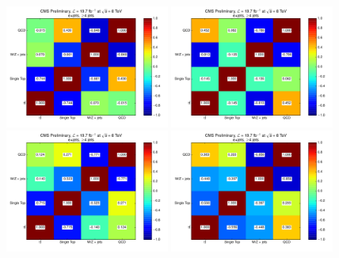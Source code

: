 \begin{figure}[hbtp]
    \centering
     \includegraphics[width=0.48\textwidth]{Chapters/07_08_09_Analysis/Images/fitchecks/8TeV/Correlations_electron_MET_0-27}\hfill    
     \includegraphics[width=0.48\textwidth]{Chapters/07_08_09_Analysis/Images/fitchecks/8TeV/Correlations_electron_MET_27-52}\\
	 \includegraphics[width=0.48\textwidth]{Chapters/07_08_09_Analysis/Images/fitchecks/8TeV/Correlations_electron_MET_52-87}\hfill
	 \includegraphics[width=0.48\textwidth]{Chapters/07_08_09_Analysis/Images/fitchecks/8TeV/Correlations_electron_MET_87-130}\\

\end{figure}
